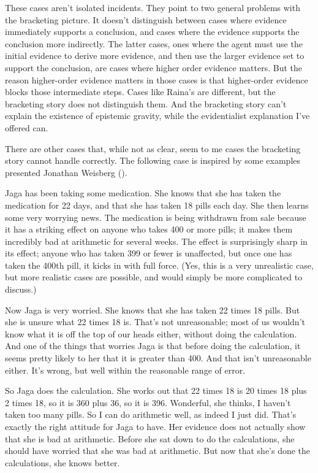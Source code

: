 \documentclass[
  10pt,
  letterpaper,
  twoside]{scrbook}
\begin{document}
These cases aren't isolated incidents. They point to two general
problems with the bracketing picture. It doesn't distinguish between
cases where evidence immediately supports a conclusion, and cases where
the evidence supports the conclusion more indirectly. The latter cases,
ones where the agent must use the initial evidence to derive more
evidence, and then use the larger evidence set to support the
conclusion, are cases where higher order evidence matters. But the
reason higher-order evidence matters in those cases is that higher-order
evidence blocks those intermediate steps. Cases like Raina's are
different, but the bracketing story does not distinguish them. And the
bracketing story can't explain the existence of epistemic gravity, while
the evidentialist explanation I've offered can.

There are other cases that, while not as clear, seem to me cases the
bracketing story cannot handle correctly. The following case is inspired
by some examples presented Jonathan Weisberg
().

{Jaga} has been taking some medication. She knows that she has taken the
medication for 22 days, and that she has taken 18 pills each day. She
then learns some very worrying news. The medication is being withdrawn
from sale because it has a striking effect on anyone who takes 400 or
more pills; it makes them incredibly bad at arithmetic for several
weeks. The effect is surprisingly sharp in its effect; anyone who has
taken 399 or fewer is unaffected, but once one has taken the 400th pill,
it kicks in with full force. (Yes, this is a very unrealistic case, but
more realistic cases are possible, and would simply be more complicated
to discuss.)

Now {Jaga} is very worried. She knows that she has taken 22 times 18
pills. But she is unsure what 22 times 18 is. That's not unreasonable;
most of us wouldn't know what it is off the top of our heads either,
without doing the calculation. And one of the things that worries {Jaga}
is that before doing the calculation, it seems pretty likely to her that
it is greater than 400. And that isn't unreasonable either. It's wrong,
but well within the reasonable range of error.

So {Jaga} does the calculation. She works out that 22 times 18 is 20
times 18 plus 2 times 18, so it is 360 plus 36, so it is 396. Wonderful,
she thinks, I haven't taken too many pills. So I can do arithmetic well,
as indeed I just did. That's exactly the right attitude for {Jaga} to
have. Her evidence does not actually show that she is bad at arithmetic.
Before she sat down to do the calculations, she should have worried that
she was bad at arithmetic. But now that she's done the calculations, she
knows better.
\end{document}
